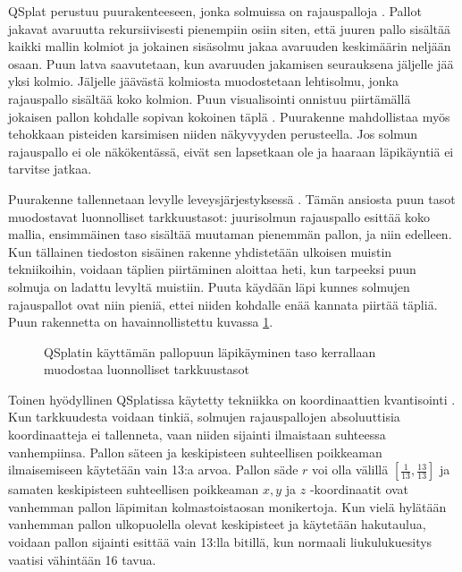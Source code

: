 QSplat perustuu puurakenteeseen, jonka solmuissa on rajauspalloja . Pallot jakavat avaruutta rekursiivisesti pienempiin osiin siten, että juuren pallo sisältää kaikki mallin kolmiot ja jokainen sisäsolmu jakaa avaruuden keskimäärin neljään osaan. Puun latva saavutetaan, kun avaruuden jakamisen seurauksena jäljelle jää yksi kolmio. Jäljelle jäävästä kolmiosta muodostetaan lehtisolmu, jonka rajauspallo sisältää koko kolmion. Puun visualisointi onnistuu piirtämällä jokaisen pallon kohdalle sopivan kokoinen täplä . Puurakenne mahdollistaa myös tehokkaan pisteiden karsimisen niiden näkyvyyden perusteella. Jos solmun rajauspallo ei ole näkökentässä, eivät sen lapsetkaan ole ja haaraan läpikäyntiä ei tarvitse jatkaa. \cite{qsplat}

Puurakenne tallennetaan levylle leveysjärjestyksessä . Tämän ansiosta puun tasot muodostavat luonnolliset tarkkuustasot: juurisolmun rajauspallo esittää koko mallia, ensimmäinen taso sisältää muutaman pienemmän pallon, ja niin edelleen. Kun tällainen tiedoston sisäinen rakenne yhdistetään ulkoisen muistin tekniikoihin, voidaan täplien piirtäminen aloittaa heti, kun tarpeeksi puun solmuja on ladattu levyltä muistiin. Puuta käydään läpi kunnes solmujen rajauspallot ovat niin pieniä, ettei niiden kohdalle enää kannata piirtää täpliä. Puun rakennetta on havainnollistettu kuvassa \ref{tarkkuustasot}. \cite{qsplat}

\begin{figure}
    \centering
    
    \caption{QSplatin käyttämän pallopuun läpikäyminen taso kerrallaan muodostaa luonnolliset tarkkuustasot}
    \label{tarkkuustasot}
\end{figure}

Toinen hyödyllinen QSplatissa käytetty tekniikka on koordinaattien kvantisointi . Kun tarkkuudesta voidaan tinkiä, solmujen rajauspallojen absoluuttisia koordinaatteja ei tallenneta, vaan niiden sijainti ilmaistaan suhteessa vanhempiinsa. Pallon säteen ja keskipisteen suhteellisen poikkeaman ilmaisemiseen käytetään vain 13:a arvoa. Pallon säde $r$ voi olla välillä $[\frac{1}{13}, \frac{13}{13}]$ ja samaten keskipisteen suhteellisen poikkeaman $x, y$ ja $z$ -koordinaatit ovat vanhemman pallon läpimitan kolmastoistaosan monikertoja. Kun vielä hylätään vanhemman pallon ulkopuolella olevat keskipisteet ja käytetään hakutaulua, voidaan pallon sijainti esittää vain 13:lla bitillä, kun normaali liukulukuesitys vaatisi vähintään 16 tavua. \cite{qsplat}

